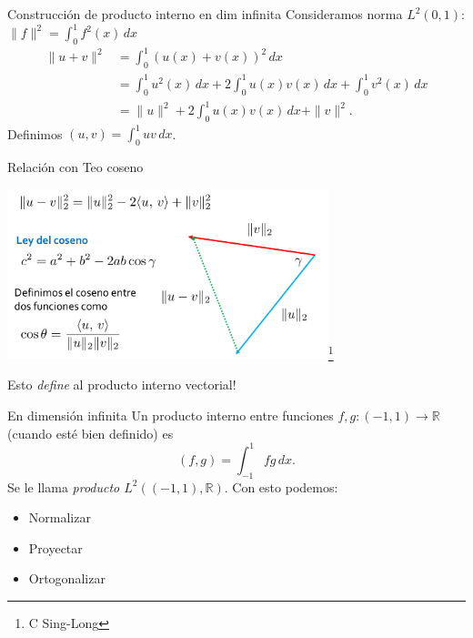 \documentclass[12pt,aspectratio=169,xcolor=dvipsnames]{beamer}
\newcommand{\R}{\mathbb{R}}
\begin{document}
\begin{frame}{Construcción de producto interno en dim infinita}
    Consideramos norma $L^2(0,1)$: $\| f \|^2 = \int_0^1 f^2(x)\,dx$
    \begin{align*}
        \| u + v \|^2 &= \int_0^1(u(x) + v(x))^2\,dx \\
                    &= \int_0^1u^2(x)\,dx + 2\int_0^1u(x)v(x)\,dx + \int_0^1v^2(x)\,dx \\
                    &= \| u \|^2 + 2\int_0^1u(x)v(x)\,dx  + \| v \|^2. 
    \end{align*}
    Definimos $(u,v) = \int_0^1uv\,dx$. 
\end{frame}
\begin{frame}{Relación con Teo coseno}
    \begin{center}
        \includegraphics[width=0.7\textwidth]{../images/teorema-coseno.png}\footnote{C Sing-Long}
    \end{center}
    \alert{Esto \emph{define} al producto interno vectorial!}
\end{frame}
\begin{frame}{En dimensión infinita}
    Un producto interno entre funciones $f,g:(-1,1)\to \R$ (cuando esté bien definido) es
    $$ (f,g) = \int_{-1}^1 fg\,dx.$$
    Se le llama \emph{producto $L^2((-1,1),\R)$}. Con esto podemos: 
        \begin{itemize}
            \item Normalizar
            \item Proyectar
            \item Ortogonalizar
        \end{itemize}
\end{frame}
\end{document}
